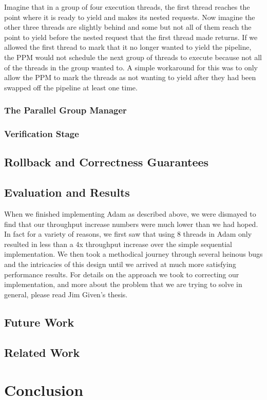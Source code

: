 \documentclass[11pt, oneside]{report}
\begin{document}
Imagine that in a group of four execution threads, the first thread reaches the point where it is ready to yield and makes its nested requests. Now imagine the other three threads are slightly behind and some but not all of them reach the point to yield before the nested request that the first thread made returns. If we allowed the first thread to mark that it no longer wanted to yield the pipeline, the PPM would not schedule the next group of threads to execute because not all of the threads in the group wanted to. A simple workaround for this was to only allow the PPM to mark the threads as not wanting to yield after they had been swapped off the pipeline at least one time.

\subsection{The Parallel Group Manager}

\subsection{Verification Stage}

\section{Rollback and Correctness Guarantees}

\section{Evaluation and Results}

When we finished implementing Adam as described above, we were dismayed to find that our throughput increase numbers were much lower than we had hoped. In fact for a variety of reasons, we first saw that using 8 threads in Adam only resulted in less than a 4x throughput increase over the simple sequential implementation. We then took a methodical journey through several heinous bugs and the intricacies of this design until we arrived at much more satisfying performance results. For details on the approach we took to correcting our implementation, and more about the problem that we are trying to solve in general, please read Jim Given's thesis.

\section{Future Work}



\section{Related Work}

\chapter{Conclusion}
\end{document}
